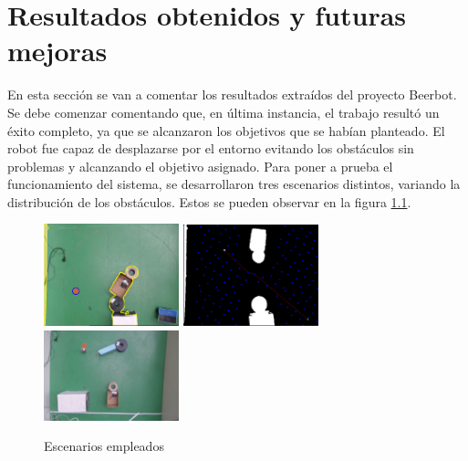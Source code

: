\chapter{Resultados obtenidos y futuras mejoras}
\label{resultados}

En esta sección se van a comentar los resultados extraídos del proyecto Beerbot. Se debe comenzar comentando que, en última instancia, el trabajo resultó un éxito completo, ya que se alcanzaron los objetivos que se habían planteado. El robot fue capaz de desplazarse por el entorno evitando los obstáculos sin problemas y alcanzando el objetivo asignado. Para poner a prueba el funcionamiento del sistema, se desarrollaron tres escenarios distintos, variando la distribución de los obstáculos. Estos se pueden observar en la figura \ref{escenarios}.\\

\begin{figure}[h]
		\centering
        \includegraphics[width=0.35\textwidth]{images/configuration1_segmented.png}
        \includegraphics[width=0.35\textwidth]{images/configuration2_trajectory.png}
        \includegraphics[width=0.35\textwidth]{images/configuration_3.jpg}
        \caption{Escenarios empleados}
        \label{escenarios}
\end{figure}

